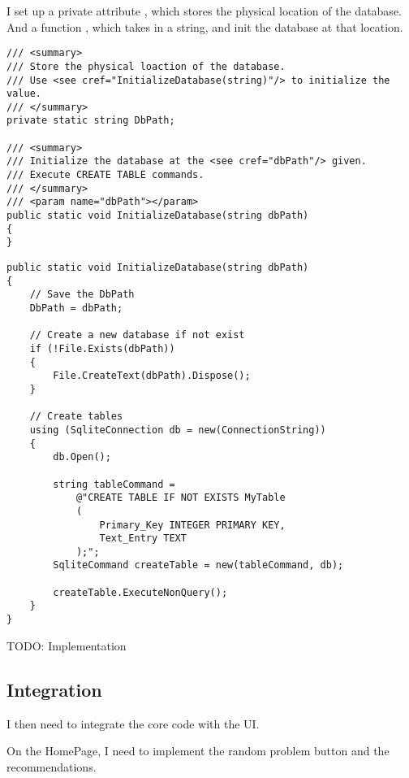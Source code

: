 \documentclass[report.tex]{subfiles}
\begin{document}
I set up a private attribute , which stores the physical location of the database. And a function , which takes in a string, and init the database at that location.

\begin{verbatim}
/// <summary>
/// Store the physical loaction of the database.
/// Use <see cref="InitializeDatabase(string)"/> to initialize the value.
/// </summary>
private static string DbPath;

/// <summary>
/// Initialize the database at the <see cref="dbPath"/> given.
/// Execute CREATE TABLE commands.
/// </summary>
/// <param name="dbPath"></param>
public static void InitializeDatabase(string dbPath)
{
}
\end{verbatim}

\begin{verbatim}
public static void InitializeDatabase(string dbPath)
{
    // Save the DbPath
    DbPath = dbPath;

    // Create a new database if not exist
    if (!File.Exists(dbPath))
    {
        File.CreateText(dbPath).Dispose();
    }

    // Create tables
    using (SqliteConnection db = new(ConnectionString))
    {
        db.Open();

        string tableCommand =
            @"CREATE TABLE IF NOT EXISTS MyTable 
            (
                Primary_Key INTEGER PRIMARY KEY,
                Text_Entry TEXT
            );";
        SqliteCommand createTable = new(tableCommand, db);

        createTable.ExecuteNonQuery();
    }
}
\end{verbatim}

TODO: Implementation

\subsection{Integration}

I then need to integrate the core code with the UI.

On the HomePage, I need to implement the random problem button and the recommendations.
\end{document}
